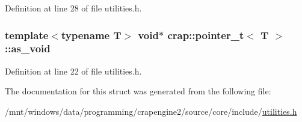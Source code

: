 Definition at line 28 of file utilities.\+h.

\hypertarget{structcrap_1_1pointer__t_a60272c75c04aaafaf6a4339f10d81b32}{
\subsubsection[{as\+\_\+void}]{\setlength{\rightskip}{0pt plus 5cm}template$<$typename T$>$ void$\ast$ {\bf crap\+::pointer\+\_\+t}$<$ T $>$\+::as\+\_\+void}}\label{structcrap_1_1pointer__t_a60272c75c04aaafaf6a4339f10d81b32}


Definition at line 22 of file utilities.\+h.



The documentation for this struct was generated from the following file\+:\begin{DoxyCompactItemize}
\item 
/mnt/windows/data/programming/crapengine2/source/core/include/\hyperlink{utilities_8h}{utilities.\+h}\end{DoxyCompactItemize}
